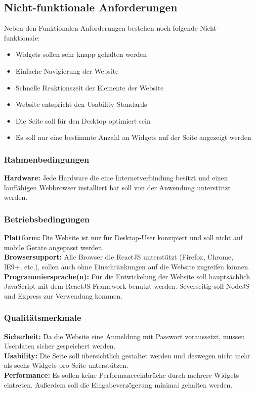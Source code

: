 	\subsection{Nicht-funktionale Anforderungen}
		Neben den Funktionalen Anforderungen bestehen noch folgende Nicht-funktionale:
		\begin{itemize}
			\item Widgets sollen sehr knapp gehalten werden
			\item Einfache Navigierung der Website
			\item Schnelle Reaktionszeit der Elemente der Website
			\item Website entspricht den Usability Standards
			\item Die Seite soll für den Desktop optimiert sein
			\item Es soll nur eine bestimmte Anzahl an Widgets auf der Seite angezeigt werden
		\end{itemize}
	
		\subsubsection{Rahmenbedingungen}
			\textbf{Hardware: }Jede Hardware die eine Internetverbindung besitzt und einen lauffähigen Webbrowser installiert hat soll von der Anwendung unterstützt werden.
		
		\subsubsection{Betriebsbedingungen}
			\textbf{Plattform: }Die Website ist nur für Desktop-User konzipiert und soll nicht auf mobile Geräte angepasst werden.\\
			\textbf{Browsersupport: }Alle Browser die ReactJS unterstützt (Firefox, Chrome, IE9+, etc.), sollen auch ohne Einschränkungen auf die Website zugreifen können.\\
			\textbf{Programmiersprache(n): }Für die Entwickelung der Website soll hauptsächlich JavaScript mit dem ReactJS Framework benutzt werden. Severseitig soll NodeJS und Express zur Verwendung kommen.\\
		
		\subsubsection{Qualitätsmerkmale}
			\textbf{Sicherheit: }Da die Website eine Anmeldung mit Passwort voraussetzt, müssen Userdaten sicher gespeichert werden.\\
			\textbf{Usability: }Die Seite soll übersichtlich gestaltet werden und deswegen nicht mehr als sechs Widgets pro Seite unterstützen.\\
			\textbf{Performance: }Es sollen keine Performanceeinbrüche durch mehrere Widgets eintreten. Außerdem soll die Eingabeverzögerung minimal gehalten werden.\\
			 
